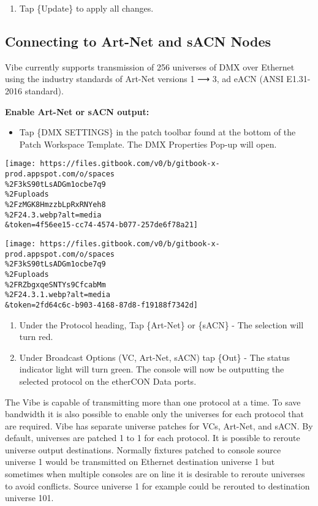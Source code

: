 \documentclass[
]{article}
\providecommand{\tightlist}{%
  \setlength{\itemsep}{0pt}\setlength{\parskip}{0pt}}
\begin{document}
\begin{enumerate}
\def\labelenumi{\arabic{enumi}.}
\setcounter{enumi}{3}
\tightlist
\item
  Tap \{Update\} to apply all changes.
\end{enumerate}

\hypertarget{connecting-to-art-net-and-sacn-nodes}{%
\subsection{Connecting to Art-Net and sACN Nodes}\label{connecting-to-art-net-and-sacn-nodes}}

Vibe currently supports transmission of 256 universes of DMX over Ethernet using the industry standards of Art-Net versions 1 ⟶ 3, ad eACN (ANSI E1.31-2016 standard).

\textbf{Enable Art-Net or sACN output:}

\begin{itemize}
\tightlist
\item
  Tap \{DMX SETTINGS\} in the patch toolbar found at the bottom of the Patch Workspace Template. The DMX Properties Pop-up will open.
\end{itemize}

\texttt{[image: https://files.gitbook.com/v0/b/gitbook-x-prod.appspot.com/o/spaces\\\%2F3kS90tLsADGm1ocbe7q9\\\%2Fuploads\\\%2FzMGK8HmzzbLpRxRNYeh8\\\%2F24.3.webp?alt=media\\\&token=4f56ee15-cc74-4574-b077-257de6f78a21]}

\texttt{[image: https://files.gitbook.com/v0/b/gitbook-x-prod.appspot.com/o/spaces\\\%2F3kS90tLsADGm1ocbe7q9\\\%2Fuploads\\\%2FRZbgxqeSNTYs9CfcabMm\\\%2F24.3.1.webp?alt=media\\\&token=2fd64c6c-b903-4168-87d8-f19188f7342d]}

\begin{enumerate}
\def\labelenumi{\arabic{enumi}.}
\item
  Under the Protocol heading, Tap \{Art-Net\} or \{sACN\} - The selection will turn red.
\item
  Under Broadcast Options (VC, Art-Net, sACN) tap \{Out\} - The status indicator light will turn green. The console will now be outputting the selected protocol on the etherCON Data ports.
\end{enumerate}

The Vibe is capable of transmitting more than one protocol at a time. To save bandwidth it is also possible to enable only the universes for each protocol that are required. Vibe has separate universe patches for VCs, Art-Net, and sACN. By default, universes are patched 1 to 1 for each protocol. It is possible to reroute universe output destinations. Normally fixtures patched to console source universe 1 would be transmitted on Ethernet destination universe 1 but sometimes when multiple consoles are on line it is desirable to reroute universes to avoid conflicts. Source universe 1 for example could be rerouted to destination universe 101.
\end{document}
